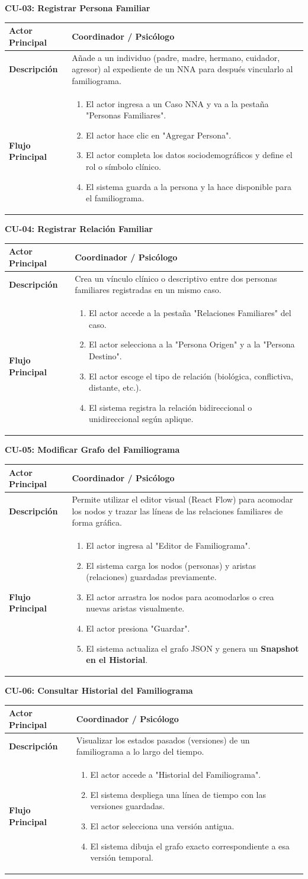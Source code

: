 \documentclass[12pt]{article}
\newcommand{\CasoDeUso}[5]{
    \vspace{1.5em}\noindent\textcolor{ipnGuinda}{\textbf{\Large CU-#1: #2}}\par\vspace{0.8em}
    \renewcommand{\arraystretch}{1.3}
    \begin{tabular}{|>{\columncolor{tablaHeader}\bfseries}p{3.5cm}|p{11.5cm}|}
    \hline
    Actor Principal & #3 \\
    \hline
    Descripción & #4 \\
    \hline
    Flujo Principal & #5 \\
    \hline
    \end{tabular}\vspace{1.5em}
}
\begin{document}
\CasoDeUso{03}{Registrar Persona Familiar}
{Coordinador / Psicólogo}
{Añade a un individuo (padre, madre, hermano, cuidador, agresor) al expediente de un NNA para después vincularlo al familiograma.}
{
\begin{enumerate}
    \item El actor ingresa a un Caso NNA y va a la pestaña "Personas Familiares".
    \item El actor hace clic en "Agregar Persona".
    \item El actor completa los datos sociodemográficos y define el rol o símbolo clínico.
    \item El sistema guarda a la persona y la hace disponible para el familiograma.
\end{enumerate}
}

\CasoDeUso{04}{Registrar Relación Familiar}
{Coordinador / Psicólogo}
{Crea un vínculo clínico o descriptivo entre dos personas familiares registradas en un mismo caso.}
{
\begin{enumerate}
    \item El actor accede a la pestaña "Relaciones Familiares" del caso.
    \item El actor selecciona a la "Persona Origen" y a la "Persona Destino".
    \item El actor escoge el tipo de relación (biológica, conflictiva, distante, etc.).
    \item El sistema registra la relación bidireccional o unidireccional según aplique.
\end{enumerate}
}

\CasoDeUso{05}{Modificar Grafo del Familiograma}
{Coordinador / Psicólogo}
{Permite utilizar el editor visual (React Flow) para acomodar los nodos y trazar las líneas de las relaciones familiares de forma gráfica.}
{
\begin{enumerate}
    \item El actor ingresa al "Editor de Familiograma".
    \item El sistema carga los nodos (personas) y aristas (relaciones) guardadas previamente.
    \item El actor arrastra los nodos para acomodarlos o crea nuevas aristas visualmente.
    \item El actor presiona "Guardar".
    \item El sistema actualiza el grafo JSON y genera un \textbf{Snapshot en el Historial}.
\end{enumerate}
}

\CasoDeUso{06}{Consultar Historial del Familiograma}
{Coordinador / Psicólogo}
{Visualizar los estados pasados (versiones) de un familiograma a lo largo del tiempo.}
{
\begin{enumerate}
    \item El actor accede a "Historial del Familiograma".
    \item El sistema despliega una línea de tiempo con las versiones guardadas.
    \item El actor selecciona una versión antigua.
    \item El sistema dibuja el grafo exacto correspondiente a esa versión temporal.
\end{enumerate}
}
\end{document}
